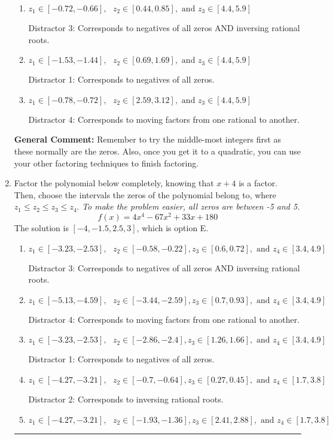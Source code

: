 \documentclass{extbook}[14pt]
\newcommand{\litem}[1]{\item #1

\rule{\textwidth}{0.4pt}}
\begin{document}
\begin{enumerate}
{\begin{enumerate}[label=\Alph*.]
* This is the solution!
\item \( z_1 \in [-0.72, -0.66], \text{   }  z_2 \in [0.44, 0.85], \text{   and   } z_3 \in [4.4, 5.9] \)

 Distractor 3: Corresponds to negatives of all zeros AND inversing rational roots.
\item \( z_1 \in [-1.53, -1.44], \text{   }  z_2 \in [0.69, 1.69], \text{   and   } z_3 \in [4.4, 5.9] \)

 Distractor 1: Corresponds to negatives of all zeros.
\item \( z_1 \in [-0.78, -0.72], \text{   }  z_2 \in [2.59, 3.12], \text{   and   } z_3 \in [4.4, 5.9] \)

 Distractor 4: Corresponds to moving factors from one rational to another.
\end{enumerate}

\textbf{General Comment:} Remember to try the middle-most integers first as these normally are the zeros. Also, once you get it to a quadratic, you can use your other factoring techniques to finish factoring.
}
\litem{
Factor the polynomial below completely, knowing that $x+4$ is a factor. Then, choose the intervals the zeros of the polynomial belong to, where $z_1 \leq z_2 \leq z_3 \leq z_4$. \textit{To make the problem easier, all zeros are between -5 and 5.}
\[ f(x) = 4x^{4} -67 x^{2} +33 x + 180 \]The solution is \( [-4, -1.5, 2.5, 3] \), which is option E.\begin{enumerate}[label=\Alph*.]
\item \( z_1 \in [-3.23, -2.53], \text{   }  z_2 \in [-0.58, -0.22], z_3 \in [0.6, 0.72], \text{   and   } z_4 \in [3.4, 4.9] \)

 Distractor 3: Corresponds to negatives of all zeros AND inversing rational roots.
\item \( z_1 \in [-5.13, -4.59], \text{   }  z_2 \in [-3.44, -2.59], z_3 \in [0.7, 0.93], \text{   and   } z_4 \in [3.4, 4.9] \)

 Distractor 4: Corresponds to moving factors from one rational to another.
\item \( z_1 \in [-3.23, -2.53], \text{   }  z_2 \in [-2.86, -2.4], z_3 \in [1.26, 1.66], \text{   and   } z_4 \in [3.4, 4.9] \)

 Distractor 1: Corresponds to negatives of all zeros.
\item \( z_1 \in [-4.27, -3.21], \text{   }  z_2 \in [-0.7, -0.64], z_3 \in [0.27, 0.45], \text{   and   } z_4 \in [1.7, 3.8] \)

 Distractor 2: Corresponds to inversing rational roots.
\item \( z_1 \in [-4.27, -3.21], \text{   }  z_2 \in [-1.93, -1.36], z_3 \in [2.41, 2.88], \text{   and   } z_4 \in [1.7, 3.8] \)


\end{enumerate}}
\end{enumerate}
\end{document}
